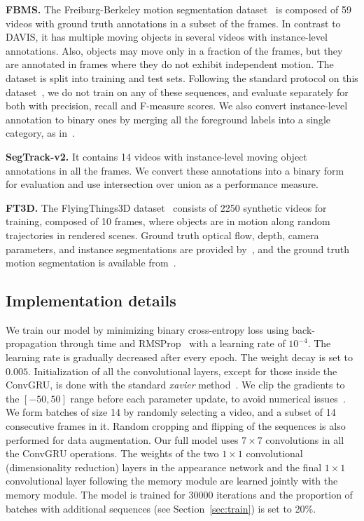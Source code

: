 \documentclass[10pt,twocolumn,letterpaper]{article}
\begin{document}
\vspace{0.3cm}\noindent\textbf{FBMS.}
The Freiburg-Berkeley motion segmentation dataset~\cite{ochs2014segmentation}
is composed of 59 videos with ground truth annotations in a subset of the
frames. In contrast to DAVIS, it has multiple moving objects in several videos
with instance-level annotations. Also, objects may move only in a fraction of
the frames, but they are annotated in frames where they do not exhibit
independent motion. The dataset is split into training and test sets. 
Following the standard protocol on this dataset~\cite{keuper2015motion}, we do
not train on any of these sequences, and evaluate separately for both
with precision, recall and F-measure scores. We also convert
instance-level annotation to binary ones by merging all the foreground
labels into a single category, as in~\cite{taylor2015causal}.

\vspace{0.3cm}\noindent\textbf{SegTrack-v2.}
It contains 14 videos with instance-level moving object annotations in all the
frames. We convert these annotations into a binary form for evaluation and use
intersection over union as a performance measure.

\vspace{0.3cm}\noindent\textbf{FT3D.}
The FlyingThings3D dataset~\cite{Mayer16} consists of 2250 synthetic videos for
training, composed of 10 frames, where objects are in motion along random
trajectories in rendered scenes. Ground truth optical flow, depth, camera
parameters, and instance segmentations are provided by~\cite{Mayer16}, and the
ground truth motion segmentation is available from~\cite{tokmakov2016web}.

\subsection{Implementation details}
\label{sec:implement}
We train our model by minimizing binary cross-entropy loss using
back-propagation through time and RMSProp~\cite{rmsprop} with a learning rate
of $10^{-4}$. The learning rate is gradually decreased after every epoch. The
weight decay is set to $0.005$. Initialization of all the convolutional layers,
except for those inside the ConvGRU, is done with the standard \textit{xavier}
method~\cite{glorot2010understanding}. We clip the gradients to the $[-50, 50]$
range before each parameter update, to avoid numerical
issues~\cite{graves2013generating}. We form batches of size 14 by randomly
selecting a video, and a subset of 14 consecutive frames in it. Random cropping
and flipping of the sequences is also performed for data augmentation. Our full
model uses $7 \times 7$ convolutions in all the ConvGRU operations. The weights
of the two $1 \times 1$ convolutional (dimensionality reduction) layers in the
appearance network and the final $1 \times 1$ convolutional layer following the
memory module are learned jointly with the memory module. The model is trained
for 30000 iterations and the proportion of batches with additional sequences
(see Section~\ref{sec:train}) is set to 20\%.
\end{document}
